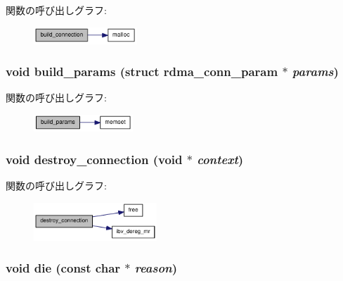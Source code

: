 関数の呼び出しグラフ:\nopagebreak
\begin{figure}[H]
\begin{center}
\leavevmode
\includegraphics[width=110pt]{rdma-common_8c_a57b367ce7e3ae058aa4e2ad739e13ec2_cgraph}
\end{center}
\end{figure}
\hypertarget{rdma-common_8c_a1fa64af8a437eea7c184fbae1713e7cb}{
\subsubsection[{build\_\-params}]{\setlength{\rightskip}{0pt plus 5cm}void build\_\-params (struct rdma\_\-conn\_\-param $\ast$ {\em params})}}
\label{rdma-common_8c_a1fa64af8a437eea7c184fbae1713e7cb}


関数の呼び出しグラフ:\nopagebreak
\begin{figure}[H]
\begin{center}
\leavevmode
\includegraphics[width=106pt]{rdma-common_8c_a1fa64af8a437eea7c184fbae1713e7cb_cgraph}
\end{center}
\end{figure}
\hypertarget{rdma-common_8c_a54feeefad62ea6509ced24a1a06a7a6e}{
\subsubsection[{destroy\_\-connection}]{\setlength{\rightskip}{0pt plus 5cm}void destroy\_\-connection (void $\ast$ {\em context})}}
\label{rdma-common_8c_a54feeefad62ea6509ced24a1a06a7a6e}


関数の呼び出しグラフ:\nopagebreak
\begin{figure}[H]
\begin{center}
\leavevmode
\includegraphics[width=131pt]{rdma-common_8c_a54feeefad62ea6509ced24a1a06a7a6e_cgraph}
\end{center}
\end{figure}
\hypertarget{rdma-common_8c_aac69fbddfabaad6d61082ad9e6f94505}{
\subsubsection[{die}]{\setlength{\rightskip}{0pt plus 5cm}void die (const char $\ast$ {\em reason})}}
\label{rdma-common_8c_aac69fbddfabaad6d61082ad9e6f94505}


